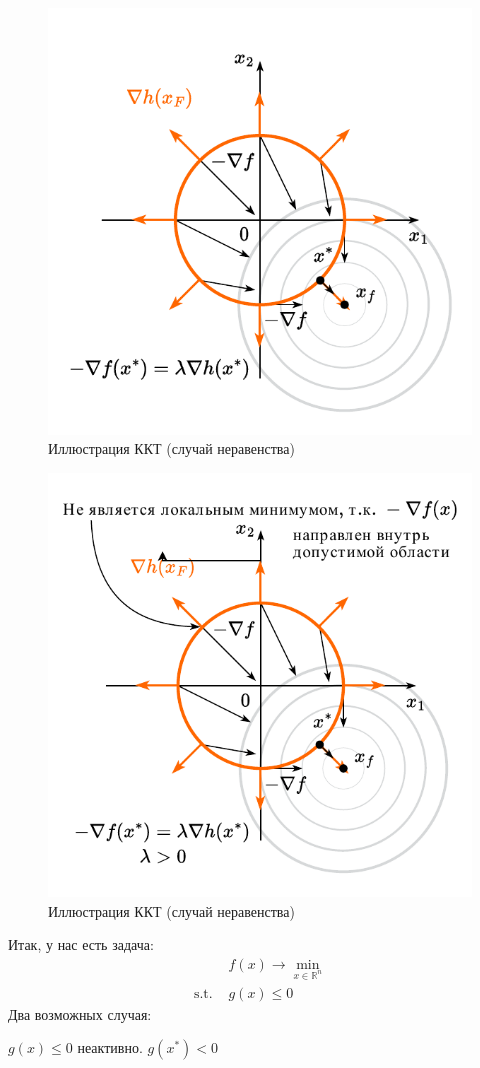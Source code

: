 \documentclass[
  russian,
  letterpaper,
  DIV=11,
  numbers=noendperiod]{scrartcl}
\begin{document}
\begin{figure}[H]

{\centering \includegraphics[width=0.5\linewidth,height=\textheight,keepaspectratio]{ineq_constr_10.pdf}

}

\caption{Иллюстрация ККТ (случай неравенства)}

\end{figure}%

\begin{figure}[H]

{\centering \includegraphics[width=0.5\linewidth,height=\textheight,keepaspectratio]{graphon-ineq_constr_11_ru.pdf}

}

\caption{Иллюстрация ККТ (случай неравенства)}

\end{figure}%

Итак, у нас есть задача: \[
\begin{split}
& f(x) \to \min\limits_{x \in \mathbb{R}^n} \\
\text{s.t. } & g(x) \leq 0
\end{split}
\] Два возможных случая:

\(g(x) \leq 0\) неактивно. \(g(x^*) < 0\)
\end{document}
